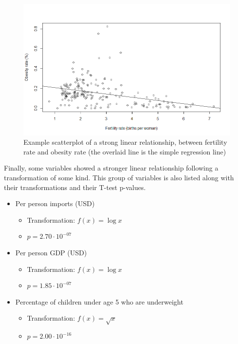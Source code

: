 \documentclass[oneside,12pt]{report}
\begin{document}
\begin{figure}
\centering
\label{fig:fertility-obesity-scatter}
\includegraphics[width=\textwidth]{fertility-obesity-scatter.png}
\caption[Scatterplot of a strong linear relationship]{Example scatterplot of a strong linear relationship, between fertility rate and obesity rate (the overlaid line is the simple regression line)}
\end{figure}

Finally, some variables showed a stronger linear relationship following a transformation of some kind. This group of variables is also listed along with their transformations and their T-test p-values.

\begin{itemize}
\item Per person imports (USD)
	\begin{itemize}
	\item Transformation: \begin{math}f(x) =\log{x}\end{math}
	\item \begin{math}p=2.70\cdot10^{-07}\end{math}
	\end{itemize}
\item Per person GDP (USD)
	\begin{itemize}
	\item Transformation: \begin{math}f(x) = \log{x}\end{math}
	\item \begin{math}p=1.85\cdot10^{-07}\end{math}
	\end{itemize}
\item Percentage of children under age 5 who are underweight
	\begin{itemize}
	\item Transformation: \begin{math}f(x) = \sqrt{x}\end{math}
	\item \begin{math}p=2.00\cdot10^{-16}\end{math}
	\end{itemize}
\end{itemize}
\end{document}
